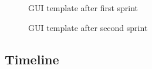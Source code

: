 \documentclass[11pt]{article} %
\begin{document}
  
  \begin{figure}[H]
  	\centering
  	\caption{GUI template after first sprint}
  	\label{fig:GUI Design 2}
  \end{figure}
  
  
  \begin{figure}[H]
  	\centering
  	\caption{GUI template after second sprint}
  	\label{fig:GUI Design 3}
  \end{figure}
  
\newpage
\subsection{Timeline}

\end{document}
